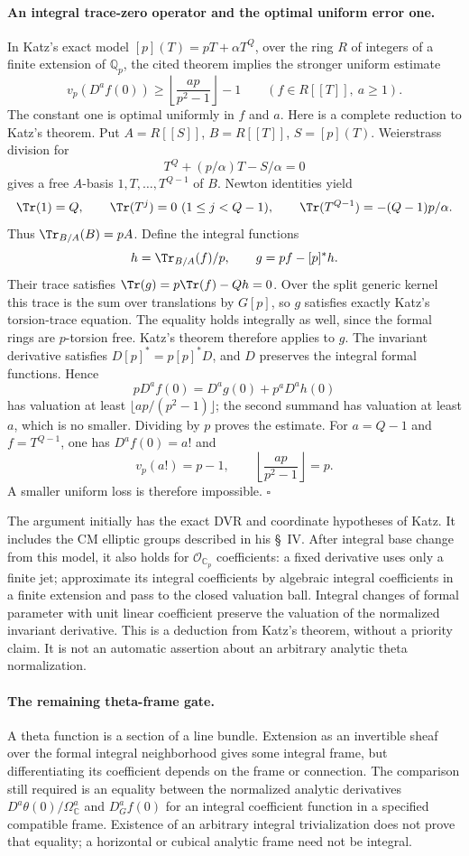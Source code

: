 \documentclass[11pt]{article}
\newcommand{\Q}{\mathbb Q}\newcommand{\C}{\mathbb C}\newcommand{\Z}{\mathbb Z}\newcommand{\R}{\mathbb R}\newcommand{\A}{\mathbb A}\newcommand{\OO}{\mathcal O}
\theoremstyle{definition}\newtheorem{definition}[theorem]{Definition}\newtheorem{remark}[theorem]{Remark}
\begin{document}
\paragraph{An integral trace-zero operator and the optimal uniform error one.}
In Katz's exact model $[p](T)=pT+\alpha T^Q$, over the ring $R$
of integers of a finite extension of $\Q_p$, the cited theorem
implies the stronger uniform estimate
\[
 v_p(D^af(0))\geq
       \left\lfloor\frac{ap}{p^2-1}\right\rfloor-1
       \qquad(f\in R[[T]],\ a\geq1).
\]
The constant one is optimal uniformly in $f$ and $a$.
Here is a complete reduction to Katz's theorem. Put
$A=R[[S]]$, $B=R[[T]]$, $S=[p](T)$. Weierstrass division for
\[
 T^Q+(p/\alpha)T-S/\alpha=0
\]
gives a free $A$-basis $1,T,\ldots,T^{Q-1}$ of $B$.
Newton identities yield
\[
 \Tr(1)=Q,\qquad \Tr(T^j)=0\ (1\leq j<Q-1),\qquad
 \Tr(T^{Q-1})=-(Q-1)p/\alpha.
\]
Thus $\Tr_{B/A}(B)=pA$. Define the integral functions
\[
 h=\Tr_{B/A}(f)/p,\qquad
 g=pf-[p]^*h.
\]
Their trace satisfies $\Tr(g)=p\Tr(f)-Qh=0$.
Over the split generic kernel this trace is the sum over translations
by $G[p]$, so $g$ satisfies exactly Katz's torsion-trace equation.
The equality holds integrally as well, since the formal rings are
$p$-torsion free. Katz's theorem therefore applies to $g$.
The invariant derivative satisfies $D[p]^*=p[p]^*D$, and $D$
preserves the integral formal functions. Hence
\[
 pD^af(0)=D^ag(0)+p^aD^ah(0)
\]
has valuation at least $\lfloor ap/(p^2-1)\rfloor$; the second
summand has valuation at least $a$, which is no smaller.
Dividing by $p$ proves the estimate. For $a=Q-1$ and
$f=T^{Q-1}$, one has $D^af(0)=a!$ and
\[
 v_p(a!)=p-1,
 \qquad\left\lfloor\frac{ap}{p^2-1}\right\rfloor=p.
\]
A smaller uniform loss is therefore impossible. $\square$

The argument initially has the exact DVR and coordinate hypotheses
of Katz. It includes the CM elliptic groups described in his \S~IV.
After integral base change from this model, it also holds for
$\mathcal O_{\C_p}$ coefficients: a fixed derivative uses only a
finite jet; approximate its integral coefficients by algebraic
integral coefficients in a finite extension and pass to the closed
valuation ball. Integral changes of formal parameter with unit
linear coefficient preserve the valuation of the normalized
invariant derivative. This is a deduction from Katz's theorem,
without a priority claim. It is not an automatic assertion about
an arbitrary analytic theta normalization.

\paragraph{The remaining theta-frame gate.}
A theta function is a section of a line bundle. Extension as an
invertible sheaf over the formal integral neighborhood gives some
integral frame, but differentiating its coefficient depends on the
frame or connection. The comparison still required is an equality
between the normalized analytic derivatives
$D^a\theta(0)/\Omega_{\C}^a$ and $D_G^af(0)$ for an integral
coefficient function in a specified compatible frame. Existence of
an arbitrary integral trivialization does not prove that equality;
a horizontal or cubical analytic frame need not be integral.
\end{document}
